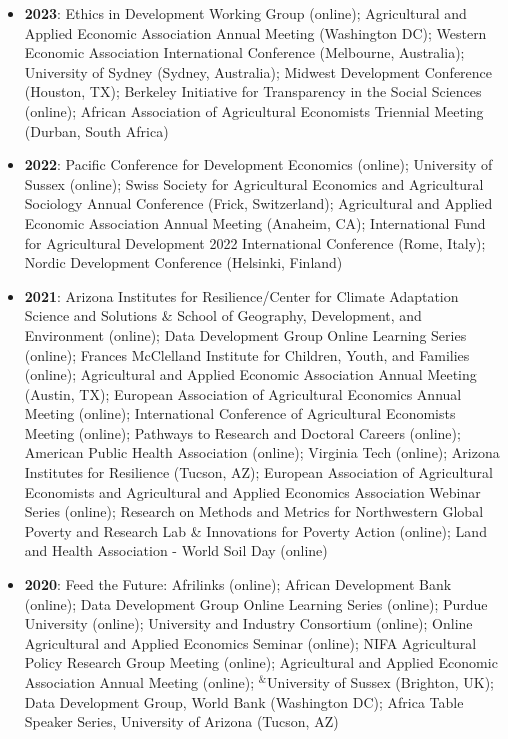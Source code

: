 \documentclass[letterpaper]{article}
\begin{document}
\begin{itemize}
\item \textbf{2023}: Ethics in Development Working Group (online); Agricultural and Applied Economic Association Annual Meeting (Washington DC); Western Economic Association International Conference (Melbourne, Australia); University of Sydney (Sydney, Australia); Midwest Development Conference (Houston, TX); Berkeley Initiative for Transparency in the Social Sciences (online); African Association of Agricultural Economists Triennial Meeting (Durban, South Africa)
	
\item \textbf{2022}: Pacific Conference for Development Economics (online); University of Sussex (online); Swiss Society for Agricultural Economics and Agricultural Sociology Annual Conference (Frick, Switzerland); Agricultural and Applied Economic Association Annual Meeting (Anaheim, CA); International Fund for Agricultural Development 2022 International Conference (Rome, Italy); Nordic Development Conference (Helsinki, Finland)
	
\item \textbf{2021}: Arizona Institutes for Resilience/Center for Climate Adaptation Science and Solutions \& School of Geography, Development, and Environment (online); Data Development Group Online Learning Series (online); Frances McClelland Institute for Children, Youth, and Families (online); Agricultural and Applied Economic Association Annual Meeting (Austin, TX); European Association of Agricultural Economics Annual Meeting (online); International Conference of Agricultural Economists Meeting (online); Pathways to Research and Doctoral Careers (online); American Public Health Association (online); Virginia Tech (online); Arizona Institutes for Resilience (Tucson, AZ); European Association of Agricultural Economists and Agricultural and Applied Economics Association Webinar Series (online); Research on Methods and Metrics for Northwestern Global Poverty and Research Lab \& Innovations for Poverty Action (online); Land and Health Association - World Soil Day (online)

\item \textbf{2020}: Feed the Future: Afrilinks (online); African Development Bank (online); Data Development Group Online Learning Series (online); Purdue University (online); University and Industry Consortium (online); Online Agricultural and Applied Economics Seminar (online); NIFA Agricultural Policy Research Group Meeting (online);  Agricultural and Applied Economic Association Annual Meeting (online); $^\&$University of Sussex (Brighton, UK); Data Development Group, World Bank (Washington DC); Africa Table Speaker Series, University of Arizona (Tucson, AZ) 


\end{itemize}
\end{document}

